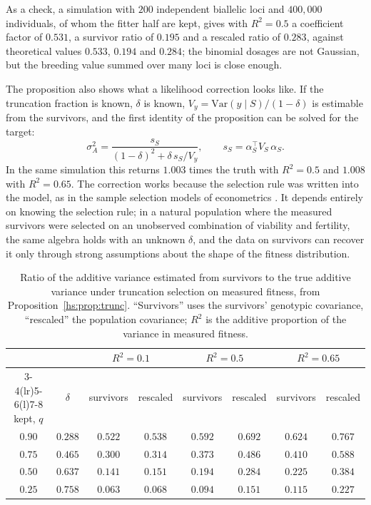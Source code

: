 \begin{example}
As a check, a simulation with $200$ independent biallelic loci and $400{,}000$ individuals, of whom the fitter half are kept, gives with $R^2 = 0.5$ a coefficient factor of $0.531$, a survivor ratio of $0.195$ and a rescaled ratio of $0.283$, against theoretical values $0.533$, $0.194$ and $0.284$; the binomial dosages are not Gaussian, but the breeding value summed over many loci is close enough.

The proposition also shows what a likelihood correction looks like. If the truncation fraction is known, $\delta$ is known, $V_y = \mathrm{Var}(y\mid S)/(1-\delta)$ is estimable from the survivors, and the first identity of the proposition can be solved for the target:
\[
\sigma^2_A = \frac{s_S}{(1-\delta)^2 + \delta\,s_S/V_y},
\qquad s_S = \alpha_S^\top V_S\,\alpha_S .
\]
In the same simulation this returns $1.003$ times the truth with $R^2 = 0.5$ and $1.008$ with $R^2 = 0.65$. The correction works because the selection rule was written into the model, as in the sample selection models of econometrics \citep{hs:heckman1979sample}. It depends entirely on knowing the selection rule; in a natural population where the measured survivors were selected on an unobserved combination of viability and fertility, the same algebra holds with an unknown $\delta$, and the data on survivors can recover it only through strong assumptions about the shape of the fitness distribution.
\end{example}

\begin{table}[t]
\centering
\small
\begin{tabular}{@{}cc cc cc cc@{}}
\toprule
& & \multicolumn{2}{c}{$R^2 = 0.1$} & \multicolumn{2}{c}{$R^2 = 0.5$} & \multicolumn{2}{c}{$R^2 = 0.65$} \\
\cmidrule(lr){3-4}\cmidrule(lr){5-6}\cmidrule(l){7-8}
kept, $q$ & $\delta$ & survivors & rescaled & survivors & rescaled & survivors & rescaled \\
\midrule
$0.90$ & $0.288$ & $0.522$ & $0.538$ & $0.592$ & $0.692$ & $0.624$ & $0.767$ \\
$0.75$ & $0.465$ & $0.300$ & $0.314$ & $0.373$ & $0.486$ & $0.410$ & $0.588$ \\
$0.50$ & $0.637$ & $0.141$ & $0.151$ & $0.194$ & $0.284$ & $0.225$ & $0.384$ \\
$0.25$ & $0.758$ & $0.063$ & $0.068$ & $0.094$ & $0.151$ & $0.115$ & $0.227$ \\
\bottomrule
\end{tabular}
\caption{Ratio of the additive variance estimated from survivors to the true additive variance under truncation selection on measured fitness, from Proposition~\ref{hs:prop:trunc}. ``Survivors'' uses the survivors' genotypic covariance, ``rescaled'' the population covariance; $R^2$ is the additive proportion of the variance in measured fitness.}
\label{hs:tab:trunc}
\end{table}

